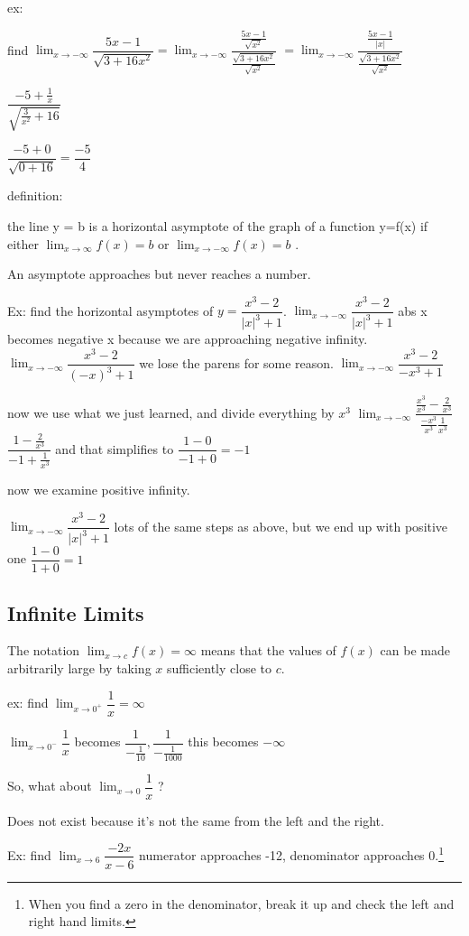 \documentclass[12pt]{article}
\begin{document}
ex:

find $\lim_{x\to-\infty}\dfrac{5x-1}{\sqrt{3+16x^2}} =
\lim_{x\to-\infty}\dfrac{\frac{5x-1}{\sqrt{x^2}}}{\frac{\sqrt{3+16x^2}}{\sqrt{x^2}}}$ 
$=  \lim_{x\to-\infty}\dfrac{\frac{5x-1}{|x|}} {\frac{\sqrt{3+16x^2}}{\sqrt{x^2}}}$

$\dfrac{-5+\frac{1}{x}}{\sqrt{\frac{3}{x^2}+16}}$

$\dfrac{-5+0}{\sqrt{0+16}} = \dfrac{-5}{4}$

definition:

the line y = b is a horizontal asymptote of the graph of a function y=f(x) if either $\lim_{x\to\infty}f(x)=b$
or $\lim_{x\to -\infty}f(x)=b$ .

An asymptote approaches but never reaches a number.

Ex: find the horizontal asymptotes of $y=\dfrac{x^3-2}{|x|^3+1}$.
$\lim_{x\to -\infty}\dfrac{x^3-2}{|x|^3+1}$
abs x becomes negative x because we are approaching negative infinity.
$\lim_{x\to -\infty}\dfrac{x^3-2}{(-x)^3+1}$
we lose the parens for some reason.
$\lim_{x\to -\infty}\dfrac{x^3-2}{-x^3+1}$

now we use what we just learned, and divide everything by $x^3$
$\lim_{x\to -\infty}\dfrac{\frac{x^3}{x^3}-\frac{2}{x^3}}{\frac{-x^3}{x^3}\frac{1}{x^3}}$
$\dfrac{1-\frac{2}{x^3}}{-1+\frac{1}{x^3}}$
and that simplifies to
$\dfrac{1-0}{-1+0} = -1$

now we examine positive infinity.

$\lim_{x\to -\infty}\dfrac{x^3-2}{|x|^3+1}$
lots of the same steps as above, but we end up with positive one
$\dfrac{1-0}{1+0} = 1$

\subsection{Infinite Limits}
The notation $\lim_{x\to c}f(x)=\infty$ means that the values of $f(x)$ can be made arbitrarily large by taking
$x$ sufficiently close to $c$.

ex: find $\lim_{x\to 0^+}\dfrac{1}{x} = \infty$

$\lim_{x\to 0^-}\dfrac{1}{x}$ becomes $\dfrac{1}{-\frac{1}{10}},\dfrac{1}{-\frac{1}{1000}}$ this becomes
$-\infty$

So, what about $\lim_{x\to 0}\dfrac{1}{x}$ ?

Does not exist because it's not the same from the left and the right.

Ex: find $\lim_{x\to 6}\dfrac{-2x}{x-6}$ numerator approaches -12, denominator approaches 0.\footnote{When you
  find a zero in the denominator, break it up and check the left and right hand limits.}
\end{document}

